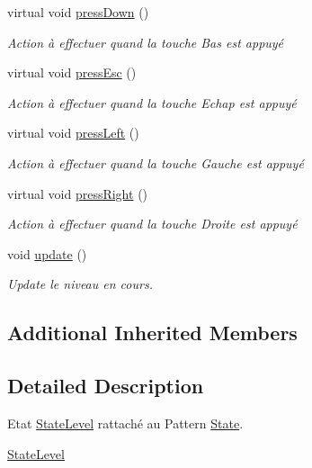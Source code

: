 \begin{DoxyCompactItemize}
virtual void \hyperlink{class_state_level_abc115526af37fd93a87b0eba998de49e}{press\+Down} ()
\begin{DoxyCompactList}\small\item\em Action à effectuer quand la touche Bas est appuyé \end{DoxyCompactList}\item 
virtual void \hyperlink{class_state_level_ab733bd4321a90d8171710dc895ee982a}{press\+Esc} ()
\begin{DoxyCompactList}\small\item\em Action à effectuer quand la touche Echap est appuyé \end{DoxyCompactList}\item 
virtual void \hyperlink{class_state_level_a0b4b1cdf50b6fa528468eea65ba09156}{press\+Left} ()
\begin{DoxyCompactList}\small\item\em Action à effectuer quand la touche Gauche est appuyé \end{DoxyCompactList}\item 
virtual void \hyperlink{class_state_level_a6ec0177bd71f7f9e60dd4896322959b1}{press\+Right} ()
\begin{DoxyCompactList}\small\item\em Action à effectuer quand la touche Droite est appuyé \end{DoxyCompactList}\item 
void \hyperlink{class_state_level_ab2adefb4d13c7534096f9744eb183577}{update} ()
\begin{DoxyCompactList}\small\item\em Update le niveau en cours. \end{DoxyCompactList}\end{DoxyCompactItemize}
\subsection*{Additional Inherited Members}


\subsection{Detailed Description}
Etat \hyperlink{class_state_level}{State\+Level} rattaché au Pattern \hyperlink{class_state}{State}. 

\hyperlink{class_state_level}{State\+Level} 


